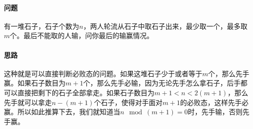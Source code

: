 \paragraph{问题} 有一堆石子，石子个数为$n$，两人轮流从石子中取石子出来，最少取一个，最多取$m$个。最后不能取的人输，问你最后的输赢情况。

\paragraph{思路} 这种就是可以直接判断必败态的问题。如果这堆石子少于或者等于$m$个，那么先手赢。如果石子数目为$m+1$个，那么先手必输，因为无论先手怎么拿石子，后手都可以直接把剩下的石子全部拿走。如果石子数目为$m+1<n<2(m + 1)$，那么先手就可以拿走$n-(m+1)$个石子，使得对手面对$m+1$的必败态，这样先手必赢。所以如此推算下去，我们就知道当$n \mod (m+1)=0$时，先手输，否则先手赢。


